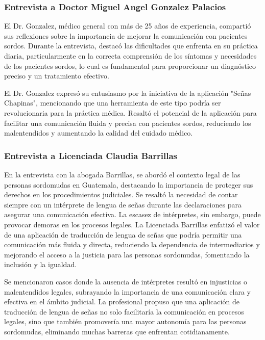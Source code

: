 \subsubsection{Entrevista a Doctor Miguel Angel Gonzalez Palacios}

El Dr. Gonzalez, médico general con más de 25 años de experiencia, compartió sus reflexiones sobre la importancia de mejorar la comunicación con pacientes sordos. Durante la entrevista, destacó las dificultades que enfrenta en su práctica diaria, particularmente en la correcta comprensión de los síntomas y necesidades de los pacientes sordos, lo cual es fundamental para proporcionar un diagnóstico preciso y un tratamiento efectivo.

El Dr. Gonzalez expresó su entusiasmo por la iniciativa de la aplicación "Señas Chapinas", mencionando que una herramienta de este tipo podría ser revolucionaria para la práctica médica. Resaltó el potencial de la aplicación para facilitar una comunicación fluida y precisa con pacientes sordos, reduciendo los malentendidos y aumentando la calidad del cuidado médico. 

\subsubsection{Entrevista a Licenciada Claudia Barrillas}

En la entrevista con la abogada Barrillas, se abordó el contexto legal de las personas sordomudas en Guatemala, destacando la importancia de proteger sus derechos en los procedimientos judiciales. Se resaltó la necesidad de contar siempre con un intérprete de lengua de señas durante las declaraciones para asegurar una comunicación efectiva. La escasez de intérpretes, sin embargo, puede provocar demoras en los procesos legales. La Licenciada Barrillas enfatizó el valor de una aplicación de traducción de lengua de señas que podría permitir una comunicación más fluida y directa, reduciendo la dependencia de intermediarios y mejorando el acceso a la justicia para las personas sordomudas, fomentando la inclusión y la igualdad.

Se mencionaron casos donde la ausencia de intérpretes resultó en injusticias o malentendidos legales, subrayando la importancia de una comunicación clara y efectiva en el ámbito judicial. La profesional propuso que una aplicación de traducción de lengua de señas no solo facilitaría la comunicación en procesos legales, sino que también promovería una mayor autonomía para las personas sordomudas, eliminando muchas barreras que enfrentan cotidianamente.

